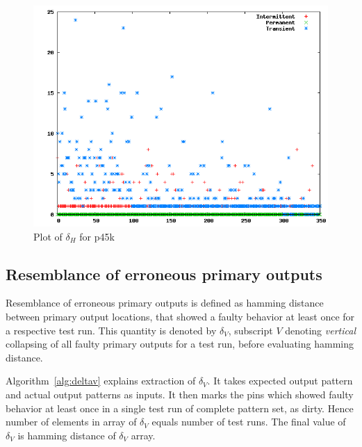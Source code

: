 \begin{figure}[h]
  \begin{center}
    \captionsetup{justification=centering}
    \includegraphics[scale=0.35]{figures/deltahp45k.png}
    \caption{Plot of $\delta_H$ for p45k}
    \label{fig:deltahp45k}
  \end{center}
\end{figure}

\subsection{Resemblance of erroneous primary outputs}
Resemblance of erroneous primary outputs is defined as hamming distance between primary output locations, that showed a faulty behavior at least once for a respective test run. This quantity is denoted by $\delta_V$, subscript $V$ denoting \emph{vertical} collapsing of all faulty primary outputs for a test run, before evaluating hamming distance.

Algorithm~\ref{alg:deltav} explains extraction of $\delta_V$. It takes expected output pattern and actual output patterns as inputs. It then marks the pins which showed faulty behavior at least once in a single test run of complete pattern set, as dirty. Hence number of elements in array of $\delta_V$ equals number of test runs. The final value of $\delta_V$ is hamming distance of $\delta_V$ array.

